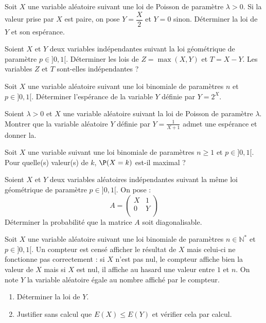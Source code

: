 \documentclass[a4paper,twoside,french,11pt]{VcCours}
\begin{document}
\begin{Exercice}{} Soit $X$ une variable aléatoire suivant une loi de Poisson de paramètre $\lambda>0$. Si la valeur prise par $X$ est paire, on pose $Y = \dfrac{X}{2}$ et $Y=0$ sinon. Déterminer la loi de $Y$ et son espérance.
\end{Exercice}

\begin{Exercice}{} Soient $X$ et $Y$ deux variables indépendantes suivant la loi géométrique de paramètre $p \in ]0,1[$. Déterminer les lois de $Z= \max(X,Y)$ et $T=X-Y$. Les variables $Z$ et $T$ sont-elles indépendantes ?
\end{Exercice}


\begin{Exercice}{} Soit $X$ une variable aléatoire suivant une loi binomiale de paramètres $n$ et $p \in ]0,1[$. Déterminer l'espérance de la variable $Y$ définie par $Y = 2^X$.
\end{Exercice}


\begin{Exercice}{} Soient $\lambda >0$ et $X$ une variable aléatoire suivant la loi de Poisson de paramètre $\lambda$. Montrer que la variable aléatoire $Y$ définie par $Y = \frac{1}{X+1}$
admet une espérance et donner la.
\end{Exercice}


\begin{Exercice}{} Soit $X$ une variable suivant une loi binomiale de paramètres $n \geq 1$ et $p \in ]0,1[$. Pour quelle(s) valeur(s) de $k$, $\P(X=k)$ est-il maximal ?
\end{Exercice}


\begin{Exercice}{} Soient $X$ et $Y$ deux variables aléatoires indépendantes suivant la même loi géométrique de paramètre $p \in ]0,1[$. On pose :
$$ A = \begin{pmatrix}
X & 1 \\
0 & Y \\
\end{pmatrix}$$
Déterminer la probabilité que la matrice $A$ soit diagonalisable.
\end{Exercice} 

\begin{Exercice}{} Soit $X$ une variable aléatoire suivant une loi binomiale de paramètres $n \in \mathbb{N}^*$ et $p \in ]0,1[$. Un compteur est censé afficher le résultat de $X$ mais celui-ci ne fonctionne pas correctement : si $X$ n'est pas nul, le compteur affiche bien la valeur de $X$ mais si $X$ est nul, il affiche au hasard une valeur entre $1$ et $n$. On note $Y$ la variable aléatoire égale au nombre affiché par le compteur.

\begin{enumerate}
\item Déterminer la loi de $Y$.
\item Justifier sans calcul que $E(X) \leq E(Y)$ et vérifier cela par calcul.
\end{enumerate}
\end{Exercice}
\end{document}

